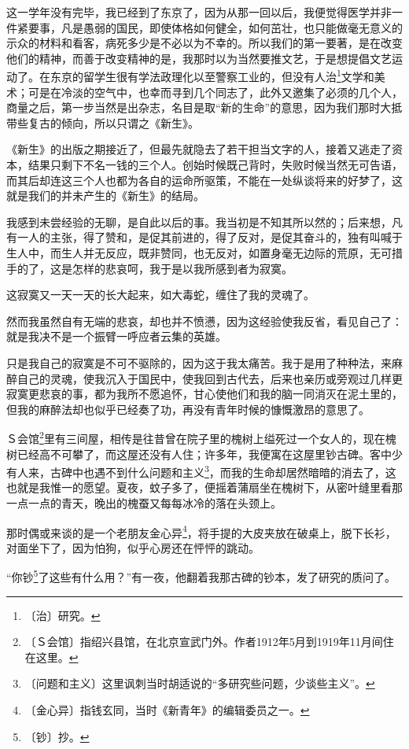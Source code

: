 \documentclass[12pt,UTF-8,openany]{ctexbook}
\begin{document}
\begin{large}
    这一学年没有完毕，我已经到了东京了，因为从那一回以后，我便觉得医学并非一件紧要事，凡是愚弱的国民，即使体格如何健全，如何茁壮，也只能做毫无意义的示众的材料和看客，病死多少是不必以为不幸的。所以我们的第一要著，是在改变他们的精神，而善于改变精神的是，我那时以为当然要推文艺，于是想提倡文艺运动了。在东京的留学生很有学法政理化以至警察工业的，但没有人治\footnote{〔治〕研究。}文学和美术；可是在冷淡的空气中，也幸而寻到几个同志了，此外又邀集了必须的几个人，商量之后，第一步当然是出杂志，名目是取“新的生命”的意思，因为我们那时大抵带些复古的倾向，所以只谓之《新生》。
    
    《新生》的出版之期接近了，但最先就隐去了若干担当文字的人，接着又逃走了资本，结果只剩下不名一钱的三个人。创始时候既己背时，失败时候当然无可告语，而其后却连这三个人也都为各自的运命所驱策，不能在一处纵谈将来的好梦了，这就是我们的并未产生的《新生》的结局。
    
    我感到未尝经验的无聊，是自此以后的事。我当初是不知其所以然的；后来想，凡有一人的主张，得了赞和，是促其前进的，得了反对，是促其奋斗的，独有叫喊于生人中，而生人并无反应，既非赞同，也无反对，如置身毫无边际的荒原，无可措手的了，这是怎样的悲哀呵，我于是以我所感到者为寂寞。
    
    这寂寞又一天一天的长大起来，如大毒蛇，缠住了我的灵魂了。
    
    然而我虽然自有无端的悲哀，却也并不愤懑，因为这经验使我反省，看见自己了：就是我决不是一个振臂一呼应者云集的英雄。
    
    只是我自己的寂寞是不可不驱除的，因为这于我太痛苦。我于是用了种种法，来麻醉自己的灵魂，使我沉入于国民中，使我回到古代去，后来也亲历或旁观过几样更寂寞更悲哀的事，都为我所不愿追怀，甘心使他们和我的脑一同消灭在泥土里的，但我的麻醉法却也似乎已经奏了功，再没有青年时候的慷慨激昂的意思了。
    
    Ｓ会馆\footnote{〔Ｓ会馆〕指绍兴县馆，在北京宣武门外。作者1912年5月到1919年11月间住在这里。}里有三间屋，相传是往昔曾在院子里的槐树上缢死过一个女人的，现在槐树已经高不可攀了，而这屋还没有人住；许多年，我便寓在这屋里钞古碑。客中少有人来，古碑中也遇不到什么问题和主义\footnote{〔问题和主义〕这里讽刺当时胡适说的“多研究些问题，少谈些主义”。}，而我的生命却居然暗暗的消去了，这也就是我惟一的愿望。夏夜，蚊子多了，便摇着蒲扇坐在槐树下，从密叶缝里看那一点一点的青天，晚出的槐蚕又每每冰冷的落在头颈上。
    
    那时偶或来谈的是一个老朋友金心异\footnote{〔金心异〕指钱玄同，当时《新青年》的编辑委员之一。}，将手提的大皮夹放在破桌上，脱下长衫，对面坐下了，因为怕狗，似乎心房还在怦怦的跳动。
    
    “你钞\footnote{〔钞〕抄。}了这些有什么用？”有一夜，他翻着我那古碑的钞本，发了研究的质问了。
    

\end{large}
\end{document}
